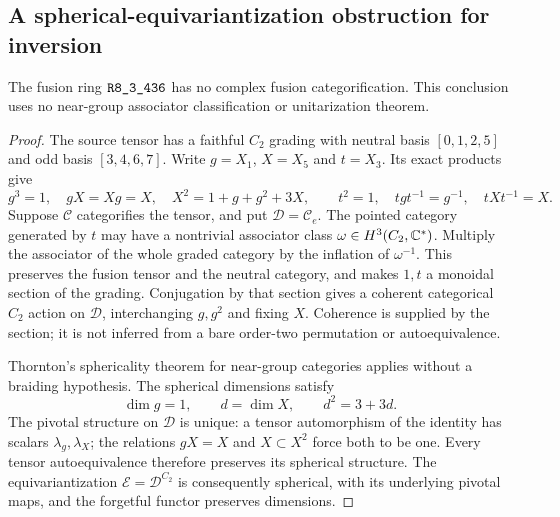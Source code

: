 \subsection{A spherical-equivariantization obstruction for inversion}
\label{subsec:r436-equivariantization}
\begin{theorem}\label{thm:r436-equivariantization}
The fusion ring $\sha{R8_3_436}$ has no complex fusion categorification.
This conclusion uses no near-group associator classification or
unitarization theorem.
\end{theorem}
\begin{proof}
The source tensor has a faithful $C_2$ grading with neutral basis
$[0,1,2,5]$ and odd basis $[3,4,6,7]$. Write $g=X_1$, $X=X_5$ and
$t=X_3$. Its exact products give
\[
g^3=1,\quad gX=Xg=X,\quad X^2=1+g+g^2+3X,
\qquad t^2=1,\quad tgt^{-1}=g^{-1},\quad tXt^{-1}=X.
\]
Suppose $\mathcal C$ categorifies the tensor, and put
$\mathcal D=\mathcal C_e$. The pointed category generated by $t$ may
have a nontrivial associator class $\omega\in H^3(C_2,\mathbb C^*)$.
Multiply the associator of the whole graded category by the inflation of
$\omega^{-1}$. This preserves the fusion tensor and the neutral category,
and makes $1,t$ a monoidal section of the grading. Conjugation by that
section gives a coherent categorical $C_2$ action on $\mathcal D$,
interchanging $g,g^2$ and fixing $X$. Coherence is supplied by the section;
it is not inferred from a bare order-two permutation or autoequivalence.

Thornton's sphericality theorem for near-group categories
\cite[Theorem~1.3]{ThorntonNear} applies without a braiding hypothesis.
The spherical dimensions satisfy
\[
\dim g=1,\qquad d=\dim X,\qquad d^2=3+3d.
\]
The pivotal structure on $\mathcal D$ is unique: a tensor automorphism
of the identity has scalars $\lambda_g,\lambda_X$; the relations $gX=X$
and $X\subset X^2$ force both to be one. Every tensor autoequivalence
therefore preserves its spherical structure. The equivariantization
$\mathcal E=\mathcal D^{C_2}$ is consequently spherical, with its
underlying pivotal maps, and the forgetful functor preserves dimensions.


\end{proof}

